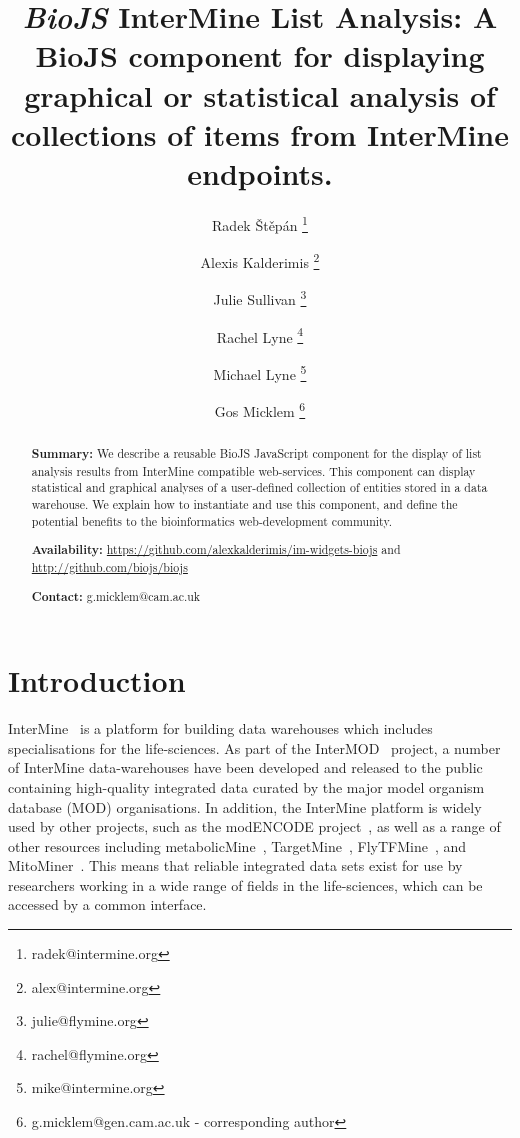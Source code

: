 \documentclass[10pt,a4paper,twocolumn]{article}
\begin{document}
\title{\textit{BioJS} InterMine List Analysis:
A BioJS component for displaying graphical or statistical analysis of
collections of items from InterMine endpoints.
}

\author[1]{Radek Štěpán \thanks{radek@intermine.org}}
\author[1]{Alexis Kalderimis \thanks{alex@intermine.org}}
\author[1]{Julie Sullivan \thanks{julie@flymine.org}}
\author[1]{Rachel Lyne \thanks{rachel@flymine.org}}
\author[1]{Michael Lyne \thanks{mike@intermine.org}}
\author[1]{Gos Micklem \thanks{g.micklem@gen.cam.ac.uk - corresponding author}}

\maketitle
\thispagestyle{fancy}

\begin{abstract}

\textbf{Summary:}
We describe a reusable BioJS JavaScript component for the display of list
analysis results from InterMine compatible web-services. This component can display
statistical and graphical analyses of a user-defined collection of entities stored
in a data warehouse. We explain how to instantiate and use this component, and
define the potential benefits to the bioinformatics web-development community.

\textbf{Availability:}
\url{https://github.com/alexkalderimis/im-widgets-biojs} and
\url{http://github.com/biojs/biojs}

\textbf{Contact:} g.micklem@cam.ac.uk

\end{abstract}
\clearpage

\section*{Introduction}

InterMine~\cite{intermine} is a platform for building data warehouses which
includes specialisations for the life-sciences. As part of the
InterMOD~\cite{intermod} project, a number of InterMine data-warehouses have
been developed and released to the public containing high-quality integrated
data curated by the major model organism database (MOD) organisations. In
addition, the InterMine platform is widely used by other projects, such as the
modENCODE project~\cite{contrino2012}, as well as a range of other resources
including metabolicMine~\cite{metabolicmine}, TargetMine~\cite{targetmine},
FlyTFMine~\cite{flytfmine}, and MitoMiner~\cite{mitominer}. This means that
reliable integrated data sets exist for use by researchers working in a wide
range of fields in the life-sciences, which can be accessed by a common
interface.
\end{document}
